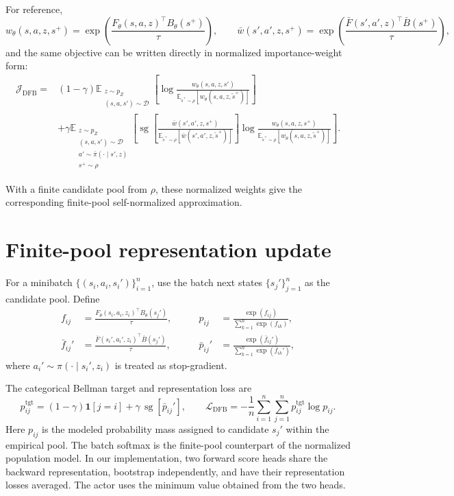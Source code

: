 \documentclass[11pt]{article}
\newcommand{\sg}{\operatorname{sg}}
\begin{document}
For reference,
\[
    w_\theta(s,a,z,s^+) = \exp\left(\frac{F_\theta(s,a,z)^\top B_\theta(s^+)}{\tau}\right), \qquad \bar w(s',a',z,s^+) = \exp\left(\frac{\bar F(s',a',z)^\top\bar B(s^+)}{\tau}\right),
\]
and the same objective can be written directly in normalized importance-weight form:
\[
\begin{aligned}
    \mathcal J_{\mathrm{DFB}} ={}& (1-\gamma)\mathbb E_{\substack{z\sim p_Z\\(s,a,s')\sim\mathcal D}}
    \left[
    \log\frac{w_\theta(s,a,z,s')}
    {\mathbb E_{\tilde s^+\sim\rho}[w_\theta(s,a,z,\tilde s^+)]}
    \right] \\
    &+ \gamma\mathbb E_{\substack{z\sim p_Z\\(s,a,s')\sim\mathcal D\\a'\sim\bar\pi(\cdot\mid s',z)\\s^+\sim\rho}}
    \left[
    \sg\!\left[
    \frac{\bar w(s',a',z,s^+)}
    {\mathbb E_{\tilde s^+\sim\rho}[\bar w(s',a',z,\tilde s^+)]}
    \right]
    \log\frac{w_\theta(s,a,z,s^+)}
    {\mathbb E_{\tilde s^+\sim\rho}[w_\theta(s,a,z,\tilde s^+)]}
    \right].
\end{aligned}
\]

With a finite candidate pool from $\rho$, these normalized weights give the corresponding finite-pool self-normalized approximation.

\section{Finite-pool representation update}
\label{sec:finite-pool}


For a minibatch $\{(s_i,a_i,s_i')\}_{i=1}^{n}$, use the batch next states $\{s_j'\}_{j=1}^{n}$ as the candidate pool. Define
\[
\begin{aligned}
    f_{ij} &= \frac{F_\theta(s_i,a_i,z_i)^\top B_\theta(s_j')}{\tau},
    &\qquad
    p_{ij} &= \frac{\exp(f_{ij})}{\sum_{k=1}^{n}\exp(f_{ik})}, \\
    \bar f_{ij}' &= \frac{\bar F(s_i',a_i',z_i)^\top\bar B(s_j')}{\tau},
    &\qquad
    \bar p_{ij}' &= \frac{\exp(\bar f_{ij}')}{\sum_{k=1}^{n}\exp(\bar f_{ik}')},
\end{aligned}
\]
where $a_i'\sim\pi(\cdot\mid s_i',z_i)$ is treated as stop-gradient.

The categorical Bellman target and representation loss are
\begin{equation}
    p_{ij}^{\mathrm{tgt}} = (1-\gamma)\mathbf 1[j=i] + \gamma\,\sg\!\left[\bar p_{ij}'\right],
    \qquad
    \mathcal L_{\mathrm{DFB}} = -\frac1n\sum_{i=1}^{n}\sum_{j=1}^{n}p_{ij}^{\mathrm{tgt}}\log p_{ij}.
    \label{eq:dfb-finite-pool}
\end{equation}
Here $p_{ij}$ is the modeled probability mass assigned to candidate $s_j'$ within the empirical pool. The batch softmax is the finite-pool counterpart of the normalized population model. In our implementation, two forward score heads share the backward representation, bootstrap independently, and have their representation losses averaged. The actor uses the minimum value obtained from the two heads.
\end{document}
